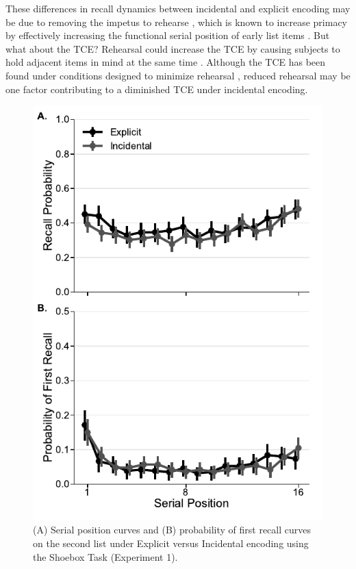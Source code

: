 \documentclass[man,natbib,floatsintext]{apa6} %
\begin{document}
These differences in recall dynamics between incidental and explicit encoding may be due to removing the impetus to rehearse \citep{MarsWerd72,Neat93,GlenEtal80}, which is known to increase primacy by effectively increasing the  functional serial position of early list items \citep{Rund71,BrodMurd77,TanWard00}. But what about the TCE? Rehearsal could increase the TCE by causing subjects to hold adjacent items in mind at the same time \citep{Hint16}. Although the TCE has been found under conditions designed to minimize rehearsal \citep{HowaKaha99}, reduced rehearsal may be one factor contributing to a diminished TCE under incidental encoding.

\begin{figure}
\includegraphics{figures/E1_spc_list2.pdf}
\caption{(A) Serial position curves and (B) probability of first recall curves on the second list under Explicit versus Incidental encoding using the Shoebox Task (Experiment 1). \spcpaneltext}
\label{e1_l2_spc}
\end{figure}
\end{document}
